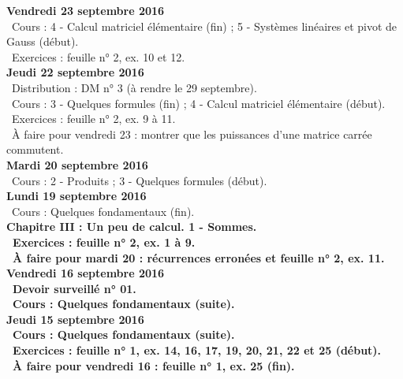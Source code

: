 \documentclass[12pt,a4paper]{article}
\begin{document}
\noindent\textbf{Vendredi 23 septembre 2016}\\
\bu\ Cours : 4 - Calcul matriciel élémentaire (fin) ; 5 - Systèmes linéaires et pivot de Gauss (début).\\
\bu\ Exercices : feuille n° 2, ex. 10 et 12.\vspace{.4cm}\\

\noindent\textbf{Jeudi 22 septembre 2016}\\
\bu\ Distribution : DM n° 3 (à rendre le 29 septembre).\\
\bu\ Cours : 3 - Quelques formules (fin) ; 4 - Calcul matriciel
élémentaire (début).\\
\bu\ Exercices : feuille n° 2, ex. 9 à 11.\\
\bu\ À faire pour vendredi 23 : montrer que les puissances d'une matrice carrée commutent.\vspace{.4cm}\\

\noindent\textbf{\bf Mardi 20 septembre 2016}\\
\bu\ Cours : 2 - Produits ; 3 - Quelques formules (début).\vspace{.4cm}\\

\noindent\textbf{Lundi 19 septembre 2016}\\
\bu\ Cours : Quelques fondamentaux (fin).\\
\bf Chapitre III \rm : Un peu de calcul. 1 - Sommes.\\
\bu\ Exercices : feuille n° 2, ex. 1 à 9.\\
\bu\ À faire pour mardi 20 : récurrences erronées et feuille n° 2, ex. 11.\vspace{.4cm}\\

\noindent\textbf{Vendredi 16 septembre 2016}\\
\bu\ Devoir surveillé n° 01.\\
\bu\ Cours : Quelques fondamentaux (suite).\vspace{.4cm}\\

\noindent\textbf{Jeudi 15 septembre 2016}\\
\bu\ Cours : Quelques fondamentaux (suite).\\
\bu\ Exercices : feuille n° 1, ex. 14, 16, 17, 19, 20, 21, 22 et 25 (début).\\
\bu\ À faire pour vendredi 16 : feuille n° 1, ex. 25 (fin).\vspace{.4cm}\\
 
\end{document}
